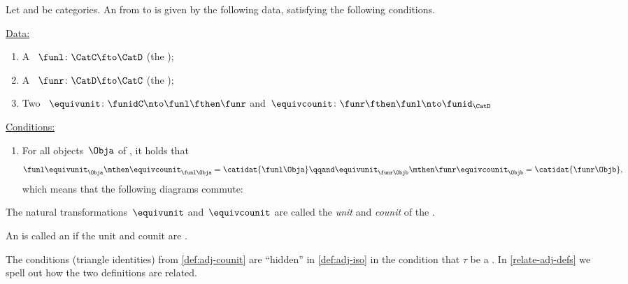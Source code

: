 \begin{ctdefinition}
    \label{def:adj-counit}
    \label{def:cat-adjunction-v2}
    Let \CatC and \CatD be categories.
    An  from \CatC to \CatD is given by the following data, satisfying the following conditions.

    \underline{Data:}
    \begin{enumerate}
        \item A ~$\funl \colon \CatC \fto \CatD$ (the );
        \item A ~$\funr \colon \CatD \fto \CatC$ (the );
        \item Two ~$\equivunit \colon \funidC \nto \funl  \fthen \funr $ and~$\equivcounit\colon \funr \fthen \funl \nto \funid_\CatD$
    \end{enumerate}

    \underline{Conditions:}
    \begin{enumerate}
        \item For all objects~$\Obja$ of \CatC, it holds that
              \begin{equation}
                  \funl \equivunit_\Obja \mthen \equivcounit_{\funl\Obja} = \catidat{\funl\Obja} \qqand
                  \equivunit_{\funr\Objb} \mthen \funr\equivcounit_\Objb = \catidat{\funr\Objb},
              \end{equation}
              which means that the following diagrams commute:
    \end{enumerate}

    The natural transformations~$\equivunit$ and~$\equivcounit$ are called the \emph{unit} and \emph{counit} of the .

\end{ctdefinition}
\begin{ctdefinition}
    \label{def:adjoin-equivalence}
    An  is called an  if the unit and counit are .
\end{ctdefinition}

\begin{remark}
    The conditions (triangle identities) from \cref{def:adj-counit} are ``hidden'' in \cref{def:adj-iso} in the condition that $\tau$ be a .
    In \cref{relate-adj-defs} we spell out how the two definitions are related.
\end{remark}
